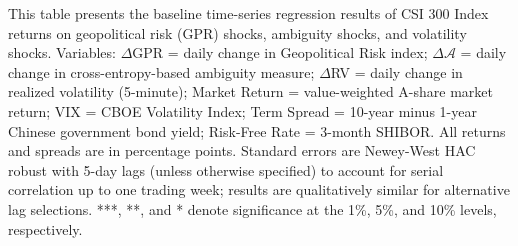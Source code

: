 \documentclass[preprint,12pt,authoryear]{elsarticle}
\begin{document}
\begin{table}[htbp]
\begin{threeparttable}
\begin{tablenotes}[flushleft]
\item[] This table presents the baseline time-series regression results of CSI 300 Index returns on geopolitical risk (GPR) shocks, ambiguity shocks, and volatility shocks. Variables: $\Delta$GPR = daily change in Geopolitical Risk index; $\Delta \mathcal{A}$ = daily change in cross-entropy-based ambiguity measure; $\Delta$RV = daily change in realized volatility (5-minute); Market Return = value-weighted A-share market return; VIX = CBOE Volatility Index; Term Spread = 10-year minus 1-year Chinese government bond yield; Risk-Free Rate = 3-month SHIBOR. All returns and spreads are in percentage points. Standard errors are Newey-West HAC robust with 5-day lags (unless otherwise specified) to account for serial correlation up to one trading week; results are qualitatively similar for alternative lag selections. ***, **, and * denote significance at the 1\%, 5\%, and 10\% levels, respectively.
\end{tablenotes}
\end{threeparttable}
\end{table}
\end{document}
